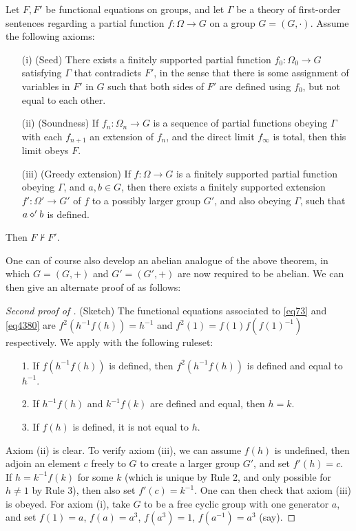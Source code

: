 \begin{theorem}\label{nc-greedy-abstract} Let $F,F'$ be functional equations on groups, and let $\Gamma$ be a theory of first-order sentences regarding a partial function $f \colon \Omega \to G$ on a group $G = (G,\cdot)$.  Assume the following axioms:
  \begin{itemize}
    \item[(i)] (Seed) There exists a finitely supported partial function $f_0 \colon \Omega_0 \to G$ satisfying $\Gamma$ that contradicts $F'$, in the sense that there is some assignment of variables in $F'$ in $G$ such that both sides of $F'$ are defined using $f_0$, but not equal to each other.
    \item[(ii)]  (Soundness)  If $f_n \colon \Omega_n \to G$ is a sequence of partial functions obeying $\Gamma$ with each $f_{n+1}$ an extension of $f_n$, and the direct limit $f_\infty$ is total, then this limit obeys $F$.
    \item[(iii)] (Greedy extension)  If $f \colon \Omega \to G$ is a finitely supported partial function obeying $\Gamma$, and $a,b \in G$, then there exists a finitely supported extension $f' \colon \Omega' \to G'$ of $f$ to a possibly larger group $G'$, and also obeying $\Gamma$, such that $a \diamond' b$ is defined.
  \end{itemize}
  Then $F \nvdash F'$.
\end{theorem}

One can of course also develop an abelian analogue of the above theorem, in which $G = (G,+)$ and $G' = (G',+)$ are now required to be abelian.  We can then give an alternate proof of  as follows:

\begin{proof}[Second proof of ] (Sketch)  The functional equations associated to \eqref{eq73} and \eqref{eq4380} are
$f^2(h^{-1} f(h)) =h^{-1}$ and $f^2(1) = f(1) f(f(1)^{-1})$ respectively.  We apply  with the following ruleset:
\begin{itemize}
  \item[1.]  If $f(h^{-1} f(h))$ is defined, then $f^2(h^{-1} f(h))$ is defined and equal to $h^{-1}$.
  \item[2.]  If $h^{-1} f(h)$ and $k^{-1} f(k)$ are defined and equal, then $h=k$.
  \item[3.]  If $f(h)$ is defined, it is not equal to $h$.
\end{itemize}
Axiom (ii) is clear.  To verify axiom (iii), we can assume $f(h)$ is undefined, then adjoin an element $c$ freely to $G$ to create a larger group $G'$, and set $f'(h) = c$.  If $h = k^{-1} f(k)$ for some $k$ (which is unique by Rule 2, and only possible for $h \neq 1$ by Rule 3), then also set $f'(c) = k^{-1}$.  One can then check that axiom (iii) is obeyed.  For axiom (i), take $G$ to be a free cyclic group with one generator $a$, and set $f(1) = a$, $f(a) = a^3$, $f(a^3) = 1$, $f(a^{-1}) = a^3$ (say).
\end{proof}

